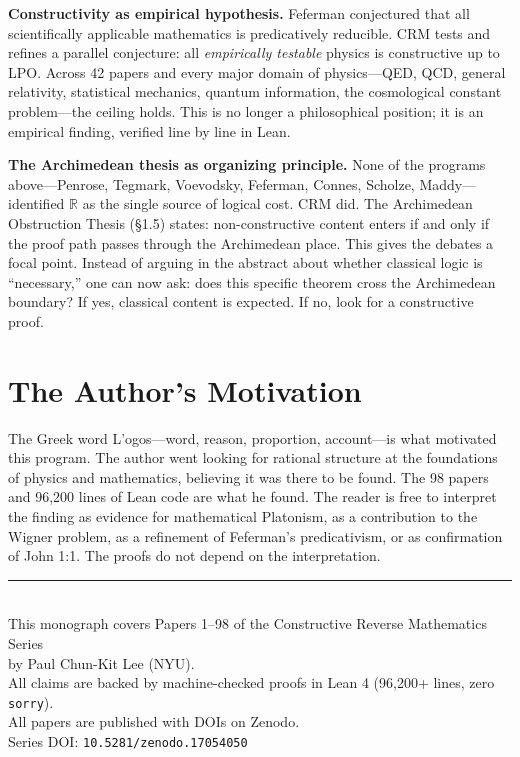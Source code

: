 \documentclass[11pt,twoside,openany]{report}
\theoremstyle{remark}
\newcommand{\LPO}{\textsf{LPO}}
\begin{document}
\textbf{Constructivity as empirical hypothesis.}
Feferman conjectured that all scientifically applicable mathematics is predicatively reducible. CRM tests and refines a parallel conjecture: all \emph{empirically testable} physics is constructive up to \LPO. Across 42 papers and every major domain of physics---QED, QCD, general relativity, statistical mechanics, quantum information, the cosmological constant problem---the ceiling holds. This is no longer a philosophical position; it is an empirical finding, verified line by line in Lean.

\textbf{The Archimedean thesis as organizing principle.}
None of the programs above---Penrose, Tegmark, Voevodsky, Feferman, Connes, Scholze, Maddy---identified $\mathbb{R}$ as the single source of logical cost. CRM did. The Archimedean Obstruction Thesis (\S1.5) states: non-constructive content enters if and only if the proof path passes through the Archimedean place. This gives the debates a focal point. Instead of arguing in the abstract about whether classical logic is ``necessary,'' one can now ask: does this specific theorem cross the Archimedean boundary? If yes, classical content is expected. If no, look for a constructive proof.

\section{The Author's Motivation}

The Greek word \foreignlanguage{greek}{L'ogos}---word, reason, proportion, account---is what motivated this program. The author went looking for rational structure at the foundations of physics and mathematics, believing it was there to be found. The 98 papers and 96,200 lines of Lean code are what he found. The reader is free to interpret the finding as evidence for mathematical Platonism, as a contribution to the Wigner problem, as a refinement of Feferman's predicativism, or as confirmation of John 1:1. The proofs do not depend on the interpretation.

\vspace{1cm}

\begin{center}
\rule{0.4\textwidth}{0.5pt}\\[8pt]
{\small This monograph covers Papers 1--98 of the Constructive Reverse Mathematics Series\\
by Paul Chun-Kit Lee (NYU).\\[4pt]
All claims are backed by machine-checked proofs in Lean 4 (96,200+ lines, zero \texttt{sorry}).\\
All papers are published with DOIs on Zenodo.\\[4pt]
Series DOI: \texttt{10.5281/zenodo.17054050}}
\end{center}
\end{document}
